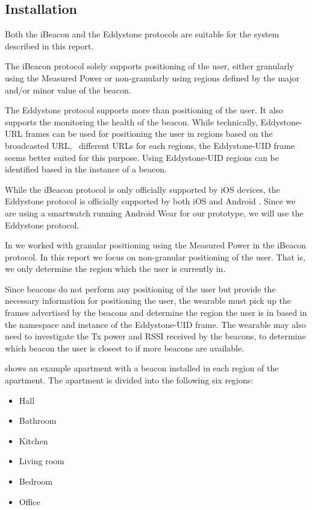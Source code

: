 \subsection{Installation}

Both the iBeacon and the Eddystone protocols are suitable for the system described in this report. 

The iBeacon protocol solely supports positioning of the user, either granularly using the Measured Power or non-granularly using regions defined by the major and/or minor value of the beacon.

The Eddystone protocol supports more than positioning of the user. It also supports the monitoring the health of the beacon. While technically, Eddystone-URL frames can be used for positioning the user in regions based on the broadcasted URL, \ie~different URLs for each regions, the Eddystone-UID frame seems better suited for this purpose. Using Eddystone-UID regions can be identified based in the instance of a beacon.

While the iBeacon protocol is only officially supported by iOS devices, the Eddystone protocol is officially supported by both iOS and Android \cite{estimote:what-is-eddystone}. Since we are using a smartwatch running Android Wear for our prototype, we will use the Eddystone protocol.

In \cite{prespecialisation} we worked with granular positioning using the Measured Power in the iBeacon protocol. In this report we focus on non-granular positioning of the user. That is, we only determine the region which the user is currently in.

Since beacons do not perform any positioning of the user but provide the necessary information for positioning the user, the wearable must pick up the frames advertised by the beacons and determine the region the user is in based in the namespace and instance of the Eddystone-UID frame. The wearable may also need to investigate the Tx power and RSSI received by the beacons, to determine which beacon the user is closest to if more beacons are available.

 shows an example apartment with a beacon installed in each region of the apartment. The apartment is divided into the following six regions:

\begin{itemize}
\item Hall
\item Bathroom
\item Kitchen
\item Living room
\item Bedroom
\item Office
\end{itemize}

